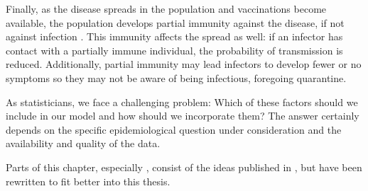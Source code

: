 Finally, as the disease spreads in the population and vaccinations become available, the population develops partial immunity against the disease, if not against infection \citep{Wu2023Longterm}. This immunity affects the spread as well: if an infector has contact with a partially immune individual, the probability of transmission is reduced. Additionally, partial immunity may lead infectors to develop fewer or no symptoms so they may not be aware of being infectious, foregoing quarantine.

As statisticians, we face a challenging problem: Which of these factors should we include in our model and how should we incorporate them? The answer certainly depends on the specific epidemiological question under consideration and the availability and quality of the data. 

Parts of this chapter, especially , consist of the ideas published in \citep{Heyder2023Measures}, but have been rewritten to fit better into this thesis.





